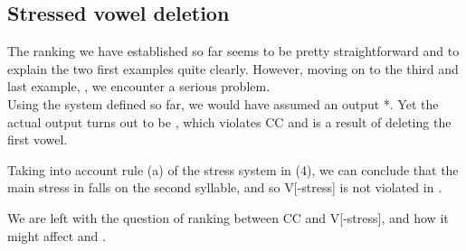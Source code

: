 \documentclass[12pt,draft]{article}
\begin{document}
\subsection{Stressed vowel deletion}

The ranking we have established so far seems to be pretty straightforward and to explain the two first examples quite clearly.
However, moving on to the third and last example, \textsl{}, we encounter a serious problem.
\\

Using the system defined so far, we would have assumed an output *\textsl{\textipa{[h5t5ft]}}.
Yet the actual output turns out to be \textsl{\textipa{[ht5ft]}}, which violates {\sc *CC} and is a result of deleting the first \textsl{\textipa{[5]}} vowel.

Taking into account rule (a) of the stress system in (4), we can conclude that the main stress in \textsl{} falls on the second syllable, and so {\sc *V[-stress]} is not violated in \textsl{\textipa{[ht5ft]}}.

We are left with the question of ranking between {\sc *CC} and {\sc *V[-stress]}, and how it might affect \textsl{} and \textsl{}.







\end{document}
